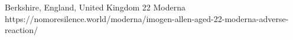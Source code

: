           {Berkshire, England, United Kingdom}
          {22}
          {Moderna}          
          {}
          {
          }
          {https://nomoresilence.world/moderna/imogen-allen-aged-22-moderna-adverse-reaction/}
